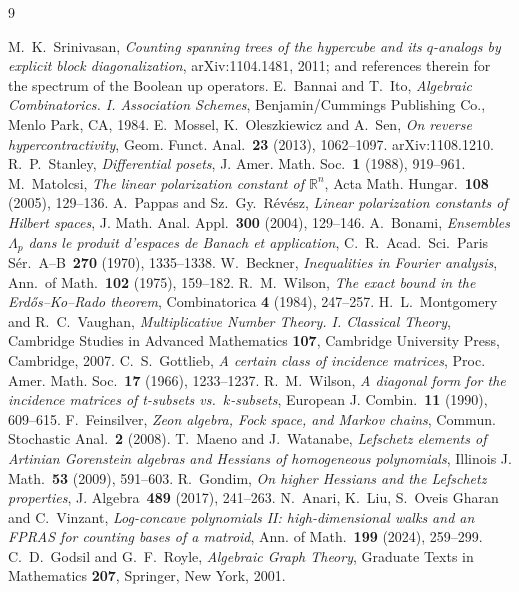 \documentclass[11pt]{article}
\theoremstyle{remark}
\begin{document}
\begin{thebibliography}{9}
\raggedright
{}
M.~K.~Srinivasan, \emph{Counting spanning trees of the hypercube and its
$q$-analogs by explicit block diagonalization}, arXiv:1104.1481, 2011;
and references therein for the spectrum of the Boolean up operators.
E.~Bannai and T.~Ito, \emph{Algebraic Combinatorics. I. Association
Schemes}, Benjamin/Cummings Publishing Co., Menlo Park, CA, 1984.
E.~Mossel, K.~Oleszkiewicz and A.~Sen, \emph{On reverse hypercontractivity},
Geom. Funct. Anal.\ \textbf{23} (2013), 1062--1097. arXiv:1108.1210.
R.~P.~Stanley, \emph{Differential posets}, J. Amer. Math. Soc.\ \textbf{1}
(1988), 919--961.
M.~Matolcsi, \emph{The linear polarization constant of $\mathbb{R}^n$},
Acta Math. Hungar.\ \textbf{108} (2005), 129--136.
A.~Pappas and Sz.~Gy.~R\'ev\'esz, \emph{Linear polarization constants of
Hilbert spaces}, J. Math. Anal. Appl.\ \textbf{300} (2004), 129--146.
A.~Bonami, \emph{Ensembles $\Lambda_p$ dans le produit d'espaces de Banach
et application}, C.\ R.\ Acad.\ Sci.\ Paris S\'er.\ A--B\ \textbf{270}
(1970), 1335--1338.
W.~Beckner, \emph{Inequalities in Fourier analysis}, Ann.\ of Math.\ \textbf{102} (1975), 159--182.
R.~M.~Wilson, \emph{The exact bound in the Erd\H{o}s--Ko--Rado theorem},
Combinatorica \textbf{4} (1984), 247--257.
H.~L.~Montgomery and R.~C.~Vaughan, \emph{Multiplicative Number Theory. I. Classical Theory}, Cambridge Studies in Advanced Mathematics \textbf{107}, Cambridge University Press, Cambridge, 2007.
C.~S.~Gottlieb, \emph{A certain class of incidence matrices},
Proc. Amer. Math. Soc.\ \textbf{17} (1966), 1233--1237.
R.~M.~Wilson, \emph{A diagonal form for the incidence matrices of
t-subsets vs.\ $k$-subsets}, European J. Combin.\ \textbf{11} (1990),
609--615.
F.~Feinsilver, \emph{Zeon algebra, Fock space, and Markov chains},
Commun. Stochastic Anal.\ \textbf{2} (2008).
T.~Maeno and J.~Watanabe, \emph{Lefschetz elements of Artinian Gorenstein
algebras and Hessians of homogeneous polynomials}, Illinois J. Math.\
\textbf{53} (2009), 591--603.
R.~Gondim, \emph{On higher Hessians and the Lefschetz properties},
J. Algebra\ \textbf{489} (2017), 241--263.
N.~Anari, K.~Liu, S.~Oveis Gharan and C.~Vinzant, \emph{Log-concave
polynomials II: high-dimensional walks and an FPRAS for counting bases of a
matroid}, Ann. of Math.\ \textbf{199} (2024), 259--299.
C.~D.~Godsil and G.~F.~Royle, \emph{Algebraic Graph Theory}, Graduate
Texts in Mathematics \textbf{207}, Springer, New York, 2001.
\end{thebibliography}
\end{document}
